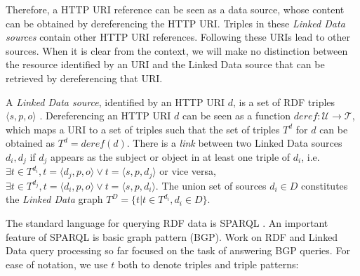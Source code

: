 Therefore, a HTTP URI reference can be seen as a data source, whose
content can be obtained by dereferencing the HTTP URI. Triples in
these \emph{Linked Data sources} contain other HTTP URI
references. Following these URIs lead to other sources. When it is
clear from the context, we will make no distinction between the
resource identified by an URI and the Linked Data source that can be
retrieved by dereferencing that URI.

\begin{definition}
  A \emph{Linked Data source}, identified by an HTTP URI $d$, is a set of RDF triples $\langle s,p,o \rangle$ . Dereferencing an
  HTTP URI $d$ can be seen as a function $deref : \mathcal{U} \rightarrow \mathcal{T}$, which maps a URI to a set of triples such that the set of triples $T^d$ for $d$ can be obtained as $T^d = \mathit{deref}(d)$. There is a \emph{link} between two Linked Data
  sources $d_i, d_j$ if $d_j$ appears as the subject or object in at
  least one triple of $d_i$, i.e. $\exists t\in T^{d_i},t=\langle d_j,p,o \rangle \vee t=\langle s,p,d_j \rangle$ or vice versa, $\exists t\in T^{d_j},t=\langle d_i,p,o \rangle \vee t=\langle s,p,d_i \rangle$. The union set of
  sources $d_i \in D$ constitutes the \emph{Linked Data} graph
  $T^D=\{t| t \in T^{d_i}, d_i \in D\}$.

\end{definition}

The standard language for querying RDF data is SPARQL
\cite{prudhommeaux_sparql_2008}. An important feature of SPARQL 
is basic graph pattern (BGP). Work on RDF and Linked Data query processing
so far focused on the task of answering BGP queries. For ease of notation, we use $t$ both to denote triples and triple patterns: 


